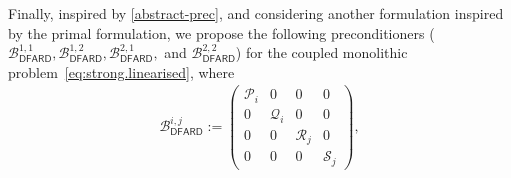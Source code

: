 \documentclass[11pt, reqno, a4paper, twoside]{article}
\newcommand{\bu}{\boldsymbol{u}}
\newcommand\bzeta{\boldsymbol{\zeta}}
\newcommand\btau{\boldsymbol{\tau}}
\newcommand{\rF}{\mathtt{F}}
\newcommand{\rL}{\mathrm{L}}
\newcommand{\rW}{\mathrm{W}}
\newcommand{\bL}{\mathbf{L}}
\newcommand{\bbA}{\mathbb{A}}
\newcommand{\bbD}{\mathbb{D}}
\newcommand{\bbB}{\mathbb{B}}
\newcommand{\bbC}{\mathbb{C}}
\newcommand{\cB}{\mathcal{B}}
\newcommand{\cS}{\mathcal{S}}
\newcommand{\cR}{\mathcal{R}}
\newcommand\vdiv{\mathop{\mathrm{div}}\nolimits}
\numberwithin{equation}{section}
\numberwithin{remark}{section}
\numberwithin{figure}{section}
\numberwithin{table}{section}
\newcommand{\cgray}[1]{{\leavevmode\color{gray}{#1}}}
\newcommand{\rrb}[1]{{\leavevmode\color{lightgreen}{#1}}}
\newcommand{\rd}[1]{\textcolor{BrickRed}{#1}}
\begin{document}

\noindent

Finally, inspired by \eqref{abstract-prec}, {and considering another formulation inspired by the primal formulation,} we propose the following preconditioners {($\cB^{1,1}_{\mathsf{DFARD}}, \cB^{1,2}_{\mathsf{DFARD}}, \cB^{2,1}_{\mathsf{DFARD}},$ and $\cB^{2,2}_{\mathsf{DFARD}}$)} for the coupled monolithic problem~\eqref{eq:strong.linearised}, where 
\begin{align}\label{precond.linear.B2}
\cB^{i,j}_{\mathsf{DFARD}}:=\begin{pmatrix}
\mathcal{P}_i & 0 & 0 & 0\\
0 &\mathcal{Q}_i& 0 & 0\\
0 & 0 & \mathcal{R}_j & 0\\
0 & 0 & 0 & \mathcal{S}_j
\end{pmatrix},
\end{align}
\end{document}
